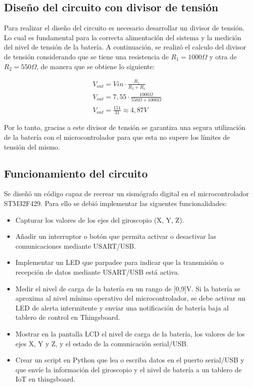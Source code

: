 \documentclass[12pt,a4paper]{article}
\begin{document}
\subsection{Diseño del circuito con divisor de tensión}
Para realizar el diseño del circuito es necesario desarrollar un divisor de tensión. Lo cual es fundamental para la correcta alimentación del sistema y la medición del nivel de tensión de la batería. A continuación, se realizó el calculo del divisor de tensión considerando que se tiene una resistencia de  $R_1=1000\Omega$ y otra de $R_2=550\Omega$, de manera que se obtiene lo siguiente:

\begin{equation*}
\begin{split}
    V_{out}= V{in} \cdot \frac{R_1}{R_2+R_1} \\
    V_{out}=7,55 \cdot \frac{1000\Omega}{550\Omega+1000\Omega} \\
    V_{out}= \frac{151}{31} \approx 4,87 V
\end{split}
\end{equation*}

Por lo tanto, gracias a este divisor de tensión se garantiza una segura utilización de la batería con el microcontrolador para que esta no supere los límites de tensión del mismo. 

\subsection{Funcionamiento del circuito}
Se diseñó un código capaz de recrear  un sismógrafo digital en el microcontrolador STM32F429. Para ello se debió implementar las siguentes funcionalidades:

\begin{itemize}
    \item Capturar los valores de los ejes del giroscopio (X, Y, Z).
    \item Añadir un interruptor o botón que permita activar o desactivar las comunicaciones mediante USART/USB.
    \item Implementar un LED que parpadee para indicar que la transmisión o recepción de datos mediante USART/USB está activa.
    \item Medir el nivel de carga de la batería en un rango de [0,9]V. Si la batería se aproxima al nivel mínimo operativo del microcontrolador, se debe activar un LED de alerta intermitente y enviar una notificación de batería baja al tablero de control en Thingsboard.
    \item Mostrar en la pantalla LCD el nivel de carga de la batería, los valores de los ejes X, Y y Z, y el estado de la comunicación serial/USB.
    \item Crear un script en Python que lea o escriba datos en el puerto serial/USB y que envíe la información del giroscopio y el nivel de batería a un tablero de IoT en thingsboard.
\end{itemize}
\end{document}
